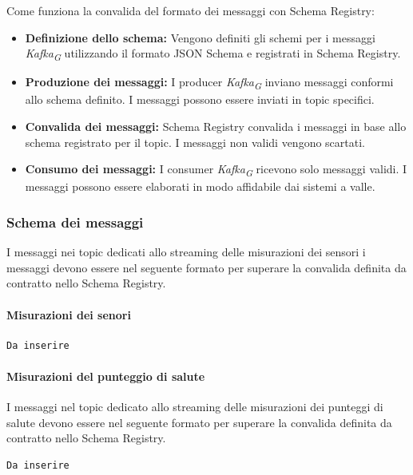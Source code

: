 Come funziona la convalida del formato dei messaggi con Schema Registry:
\begin{itemize}
    \item \textbf{Definizione dello schema:} Vengono definiti gli schemi per i messaggi \textit{Kafka}\textsubscript{\textit{G}} utilizzando il formato JSON Schema e registrati in Schema Registry.
    \item \textbf{Produzione dei messaggi:} I producer \textit{Kafka}\textsubscript{\textit{G}} inviano messaggi conformi allo schema definito. I messaggi possono essere inviati in topic specifici.
    \item \textbf{Convalida dei messaggi:} Schema Registry convalida i messaggi in base allo schema registrato per il topic. I messaggi non validi vengono scartati.
    \item \textbf{Consumo dei messaggi:} I consumer \textit{Kafka}\textsubscript{\textit{G}} ricevono solo messaggi validi. I messaggi possono essere elaborati in modo affidabile dai sistemi a valle.
\end{itemize}

\subsubsection{Schema dei messaggi}\label{sec:schema_registry_sez_schema}
I messaggi nei topic dedicati allo streaming delle misurazioni dei sensori i messaggi devono essere nel seguente formato per superare la convalida definita da contratto nello Schema Registry.
\paragraph{Misurazioni dei senori}
\begin{lstlisting}[style=code]
    Da inserire
\end{lstlisting}


\paragraph{Misurazioni del punteggio di salute}
I messaggi nel topic dedicato allo streaming delle misurazioni dei punteggi di salute devono essere nel seguente formato per superare la convalida definita da contratto nello Schema Registry.
\begin{lstlisting}[style=code]
    Da inserire
\end{lstlisting}